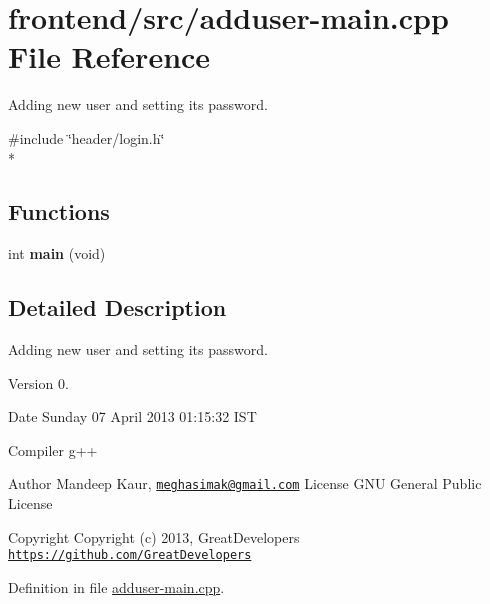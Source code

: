\hypertarget{adduser-main_8cpp}{\section{frontend/src/adduser-\/main.cpp File Reference}
\label{adduser-main_8cpp}
}


Adding new user and setting its password.  


{\ttfamily \#include \char`\"{}header/login.\-h\char`\"{}}\\*
\subsection*{Functions}
\begin{DoxyCompactItemize}
\item 
\hypertarget{adduser-main_8cpp_a840291bc02cba5474a4cb46a9b9566fe}{int {\bfseries main} (void)}\label{adduser-main_8cpp_a840291bc02cba5474a4cb46a9b9566fe}

\end{DoxyCompactItemize}


\subsection{Detailed Description}
Adding new user and setting its password. \begin{DoxyVersion}{Version}
0. 
\end{DoxyVersion}
\begin{DoxyDate}{Date}
Sunday 07 April 2013 01\-:15\-:32 I\-S\-T\par
Compiler g++
\end{DoxyDate}
\begin{DoxyAuthor}{Author}
Mandeep Kaur, \href{mailto:meghasimak@gmail.com}{\tt meghasimak@gmail.\-com} License G\-N\-U General Public License 
\end{DoxyAuthor}
\begin{DoxyCopyright}{Copyright}
Copyright (c) 2013, Great\-Developers \href{https://github.com/GreatDevelopers}{\tt https\-://github.\-com/\-Great\-Developers} 
\end{DoxyCopyright}


Definition in file \hyperlink{adduser-main_8cpp_source}{adduser-\/main.\-cpp}.

